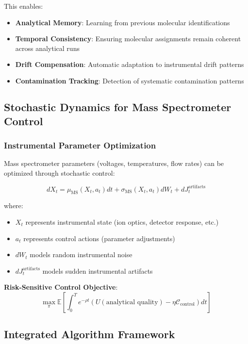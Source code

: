 \documentclass[11pt,a4paper]{article}
\theoremstyle{remark}
\begin{document}
This enables:
\begin{itemize}
\item \textbf{Analytical Memory}: Learning from previous molecular identifications
\item \textbf{Temporal Consistency}: Ensuring molecular assignments remain coherent across analytical runs
\item \textbf{Drift Compensation}: Automatic adaptation to instrumental drift patterns
\item \textbf{Contamination Tracking}: Detection of systematic contamination patterns
\end{itemize}

\subsection{Stochastic Dynamics for Mass Spectrometer Control}

\subsubsection{Instrumental Parameter Optimization}

Mass spectrometer parameters (voltages, temperatures, flow rates) can be optimized through stochastic control:

\begin{equation}
dX_t = \mu_{\text{MS}}(X_t, a_t) dt + \sigma_{\text{MS}}(X_t, a_t) dW_t + dJ_t^{\text{artifacts}}
\end{equation}

where:
\begin{itemize}
\item $X_t$ represents instrumental state (ion optics, detector response, etc.)
\item $a_t$ represents control actions (parameter adjustments)
\item $dW_t$ models random instrumental noise
\item $dJ_t^{\text{artifacts}}$ models sudden instrumental artifacts
\end{itemize}

\textbf{Risk-Sensitive Control Objective}:
\begin{equation}
\max_{\pi} \mathbb{E}\left[\int_0^T e^{-\rho t}(U(\text{analytical quality}) - \eta \mathcal{C}_{\text{control}}) dt\right]
\end{equation}

\subsection{Integrated Algorithm Framework}
\end{document}
